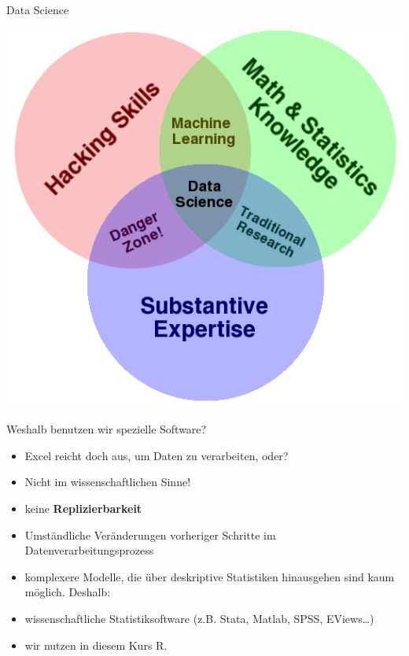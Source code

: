\documentclass[ignorenonframetext,]{beamer}
\begin{document}
\begin{frame}{Data Science}

\includegraphics{../fig/data_science_VD.png}

\end{frame}

\begin{frame}{Weshalb benutzen wir spezielle Software?}

\begin{itemize}
\itemsep1pt\parskip0pt
\item
  Excel reicht doch aus, um Daten zu verarbeiten, oder?
\item
  Nicht im wissenschaftlichen Sinne!
\item
  keine \textbf{Replizierbarkeit}
\item
  Umständliche Veränderungen vorheriger Schritte im
  Datenverarbeitungsprozess
\item
  komplexere Modelle, die über deskriptive Statistiken hinausgehen sind
  kaum möglich. Deshalb:
\item
  wissenschaftliche Statistiksoftware (z.B. Stata, Matlab, SPSS,
  EViews\ldots{})
\item
  wir nutzen in diesem Kurs R.
\end{itemize}

\end{frame}
\end{document}
